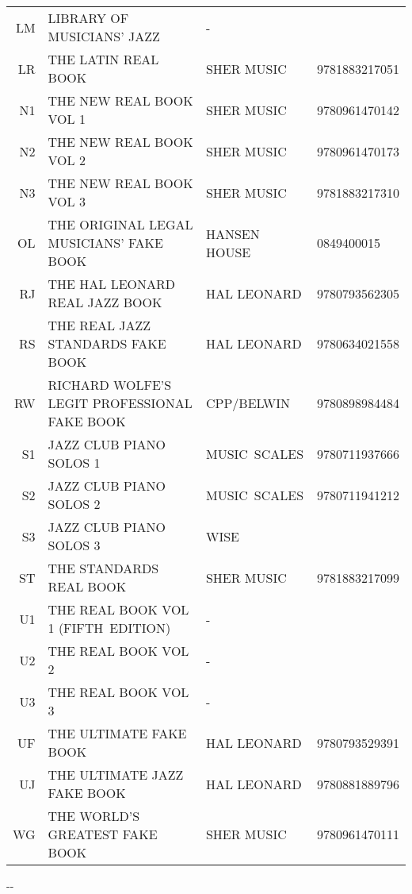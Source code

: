 \documentclass[6pt,landscape]{scrartcl}
\begin{document}
\begin{center}
\begin{tabular}{rlll}
    LM  & LIBRARY OF MUSICIANS’ JAZZ                      & -                  & \\
    LR  & THE LATIN REAL BOOK                             & SHER MUSIC         & 9781883217051 \\
    N1  & THE NEW REAL BOOK VOL 1                         & SHER MUSIC         & 9780961470142 \\
    N2  & THE NEW REAL BOOK VOL 2                         & SHER MUSIC         & 9780961470173 \\
    N3  & THE NEW REAL BOOK VOL 3                         & SHER MUSIC         & 9781883217310 \\
    OL  & THE ORIGINAL LEGAL MUSICIANS' FAKE BOOK         & HANSEN HOUSE       & 0849400015 \\
    RJ  & THE HAL LEONARD REAL JAZZ BOOK                  & HAL LEONARD        & 9780793562305 \\
    RS  & THE REAL JAZZ STANDARDS FAKE BOOK               & HAL LEONARD        & 9780634021558 \\
    RW  & RICHARD WOLFE'S LEGIT PROFESSIONAL FAKE BOOK    & CPP/BELWIN         & 9780898984484 \\
    S1  & JAZZ CLUB PIANO SOLOS 1                         & MUSIC~SCALES       & 9780711937666 \\
    S2  & JAZZ CLUB PIANO SOLOS 2                         & MUSIC~SCALES       & 9780711941212 \\
    S3  & JAZZ CLUB PIANO SOLOS 3                         & WISE               &  \\
    ST  & THE STANDARDS REAL BOOK                         & SHER MUSIC         & 9781883217099 \\
    U1  & THE REAL BOOK VOL 1 (FIFTH~EDITION)             & -                  & \\
    U2  & THE REAL BOOK VOL 2                             & -                  & \\
    U3  & THE REAL BOOK VOL 3                             & -                  & \\
    UF  & THE ULTIMATE FAKE BOOK                          & HAL LEONARD        & 9780793529391 \\
    UJ  & THE ULTIMATE JAZZ FAKE BOOK                     & HAL LEONARD        & 9780881889796 \\
    WG  & THE WORLD'S GREATEST FAKE BOOK                  & SHER MUSIC         & 9780961470111 \\
  \end{tabular}
\end{center}

\begin{multicols}{5}
  \raggedright
  
  \begin{center}
    \the\year-\the\month-\the\day
  \end{center}
\end{multicols}
\end{document}
